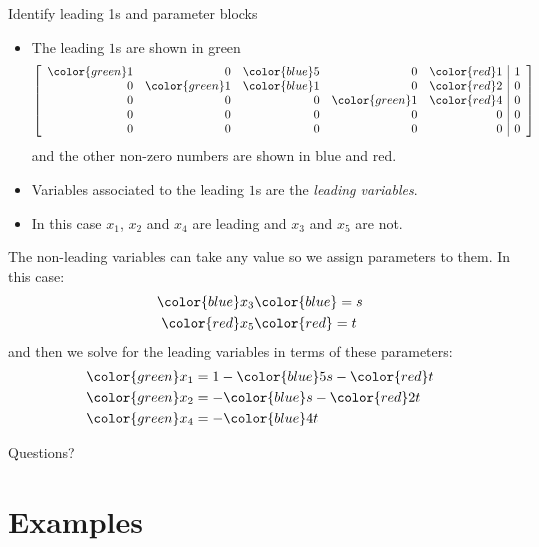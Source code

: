 \documentclass{beamer}
\begin{document}
\begin{frame}{Identify leading 1s and parameter blocks}
  \begin{itemize}
  \item The leading $1$s are shown in green
    \begin{equation*}
      \left[\begin{array}{rrrrr|r}
               {\color{green}1} & 0 & {\color{blue}5} & 0 & {\color{red}1} &1 \\
               0 & {\color{green}1} & {\color{blue}1} & 0 & {\color{red}2} &0 \\
               0 & 0 & 0 & {\color{green}1} & {\color{red}4} &0 \\
               0 & 0 & 0 & 0 & 0 &0\\
               0 & 0 & 0 & 0 & 0 &0
            \end{array}\right] 
        \end{equation*}
        and the other non-zero numbers are shown in blue and red.\vfill
      \item Variables associated to the leading $1$s are the \emph{leading variables}.\vfill
      \item In this case $x_1$, $x_2$ and $x_4$ are leading and $x_3$ and $x_5$ are not.
  \end{itemize}
\end{frame}

\begin{frame}
  The non-leading variables can take any value so we assign parameters to them.\vfill
  In this case:
  \begin{align*}
    {\color{blue}x_3} &{\color{blue}= s}\\
    {\color{red}x_5} &{\color{red}= t}
  \end{align*}
  and then we solve for the leading variables in terms of these parameters:
  \begin{align*}
    {\color{green}x_1} &= 1-{\color{blue}5s}-{\color{red}t}\\
    {\color{green}x_2} &= -{\color{blue}s}-{\color{red}2t}\\
    {\color{green}x_4} &= -{\color{blue}4t}
  \end{align*}
\end{frame}

\begin{frame}
  Questions?
\end{frame}


\section{Examples}
\end{document}
